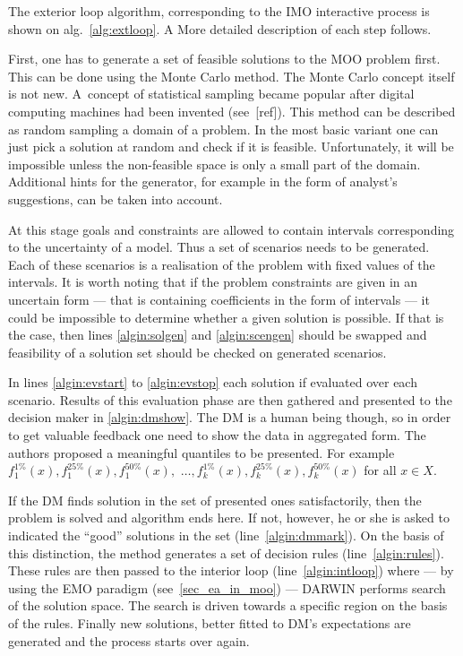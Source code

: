 The exterior loop algorithm, corresponding to the IMO interactive process is
shown on alg.~\ref{alg:extloop}. A More detailed description of each step
follows.

First, one has to generate a set of feasible solutions to the MOO problem
first. This can be done using the Monte Carlo method. The Monte Carlo concept
itself is not new. A~concept of statistical sampling became popular after
digital computing machines had been invented (see~[ref]). This method can be
described as random sampling a domain of a problem. In the most basic variant
one can just pick a solution at random and check if it is
feasible. Unfortunately, it will be impossible unless the non-feasible space
is only a small part of the domain. Additional hints for the generator, for
example in the form of analyst's suggestions, can be taken into account.

At this stage goals and constraints are allowed to contain intervals
corresponding to the uncertainty of a model. Thus a set of scenarios needs to
be generated. Each of these scenarios is a realisation of the problem with
fixed values of the intervals. It is worth noting that if the problem
constraints are given in an uncertain form --- that is containing coefficients
in the form of intervals --- it could be impossible to determine whether a
given solution is possible. If that is the case, then lines \ref{algin:solgen}
and \ref{algin:scengen} should be swapped and feasibility of a solution set
should be checked on generated scenarios.

In lines \ref{algin:evstart} to \ref{algin:evstop} each solution if evaluated
over each scenario. Results of this evaluation phase are then gathered and
presented to the decision maker in \ref{algin:dmshow}. The DM is a human being
though, so in order to get valuable feedback one need to show the data in
aggregated form. The authors proposed a meaningful quantiles to be
presented. For example $f^{1\%}_1(x), f^{25\%}_1(x), f^{50\%}_1(x),$ $\dots,
f^{1\%}_k(x), f^{25\%}_k(x), f^{50\%}_k(x)$ for all $x \in X$.

If the DM finds solution in the set of presented ones satisfactorily, then the
problem is solved and algorithm ends here. If not, however, he or she is asked
to indicated the ``good'' solutions in the set (line~\ref{algin:dmmark}).  On
the basis of this distinction, the method generates a set of decision rules
(line~\ref{algin:rules}). These rules are then passed to the interior loop
(line~\ref{algin:intloop}) where --- by using the EMO paradigm
(see~\ref{sec_ea_in_moo}) --- DARWIN performs search of the solution
space. The search is driven towards a specific region on the basis of the
rules. Finally new solutions, better fitted to DM's expectations are generated
and the process starts over again.

